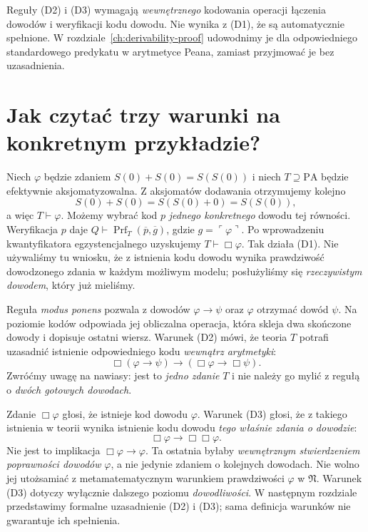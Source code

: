 \begin{uwaga}
Reguły \textup{(D2)} i \textup{(D3)} wymagają
\emph{wewnętrznego} kodowania operacji łączenia dowodów
i weryfikacji kodu dowodu.
Nie wynika z (D1), że są automatycznie spełnione.
W rozdziale~\ref{ch:derivability-proof} udowodnimy je
dla odpowiedniego standardowego predykatu w arytmetyce
Peana, zamiast przyjmować je bez uzasadnienia.
\end{uwaga}

\section{Jak czytać trzy warunki na konkretnym przykładzie?}
\begin{przyklad}[Od rachunku $1+1=2$ do zdania o dowodzie]
Niech $\varphi$ będzie zdaniem
$S(0)+S(0)=S(S(0))$ i niech $T\supseteq\mathrm{PA}$
będzie efektywnie aksjomatyzowalna. Z aksjomatów
dodawania otrzymujemy kolejno
\[
S(0)+S(0)=S(S(0)+0)=S(S(0)),
\]
a więc $T\vdash\varphi$. Możemy wybrać kod $p$
\emph{jednego konkretnego} dowodu tej równości.
Weryfikacja $p$ daje
$Q\vdash\operatorname{Prf}_T(\overline p,\overline g)$,
gdzie $g=\ulcorner\varphi\urcorner$.
Po wprowadzeniu kwantyfikatora egzystencjalnego
uzyskujemy $T\vdash\Box\varphi$.
Tak działa \textup{(D1)}. Nie używaliśmy tu wniosku,
że z istnienia kodu dowodu wynika prawdziwość dowodzonego
zdania w każdym możliwym modelu; posłużyliśmy się
\emph{rzeczywistym dowodem}, który już mieliśmy.
\end{przyklad}

\begin{uwaga}
Reguła \emph{modus ponens} pozwala z dowodów
$\varphi\to\psi$ oraz $\varphi$ otrzymać dowód $\psi$.
Na poziomie kodów odpowiada jej obliczalna operacja,
która skleja dwa skończone dowody i dopisuje
ostatni wiersz. Warunek \textup{(D2)} mówi,
że teoria $T$ potrafi uzasadnić istnienie
odpowiedniego kodu \emph{wewnątrz arytmetyki}:
\[
\Box(\varphi\to\psi)\to(\Box\varphi\to\Box\psi).
\]
Zwróćmy uwagę na nawiasy: jest to \emph{jedno zdanie}
$T$ i nie należy go mylić z regułą o \emph{dwóch
gotowych dowodach}.
\end{uwaga}

\begin{uwaga}
Zdanie $\Box\varphi$ głosi, że istnieje kod
dowodu $\varphi$. Warunek \textup{(D3)} głosi,
że z takiego istnienia w teorii wynika istnienie
kodu dowodu \emph{tego właśnie zdania o dowodzie}:
\[
\Box\varphi\to\Box\Box\varphi.
\]
Nie jest to implikacja $\Box\varphi\to\varphi$.
Ta ostatnia byłaby \emph{wewnętrznym stwierdzeniem
poprawności dowodów} $\varphi$, a nie jedynie zdaniem
o kolejnych dowodach. Nie wolno jej utożsamiać
z metamatematycznym warunkiem prawdziwości $\varphi$
w $\mathfrak N$.
Warunek (D3) dotyczy wyłącznie dalszego
poziomu \emph{dowodliwości}. W następnym rozdziale
przedstawimy formalne uzasadnienie (D2) i (D3);
sama definicja warunków nie gwarantuje ich spełnienia.
\end{uwaga}


